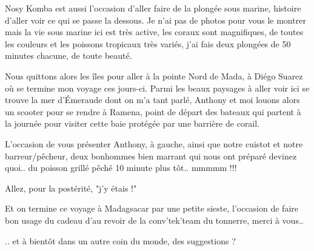 \begin{multicols}{2}
Nosy Komba est aussi l'occasion d'aller faire de la plongée sous marine, histoire d'aller voir ce qui se passe la dessous. Je n'ai pas de photos pour vous le montrer mais la vie sous marine ici est très active, les coraux sont magnifiques, de toutes les couleurs et les poissons tropicaux très variés, j'ai fais deux plongées de 50 minutes chacune, de toute beauté.

Nous quittons alors les îles pour aller à la pointe Nord de Mada, à Diégo Suarez où se termine mon voyage ces jours-ci. Parmi les beaux paysages à aller voir ici se trouve la mer d'Émeraude dont on m'a tant parlé, Anthony et moi louons alors un scooter pour se rendre à Ramena, point de départ des bateaux qui partent à la journée pour visiter cette baie protégée par une barrière de corail.

L'occasion de vous présenter Anthony, à gauche, ainsi que notre cuistot et notre barreur/pêcheur, deux bonhommes bien marrant qui nous ont préparé devinez quoi.. du poisson grillé pêché 10 minute plus tôt.. mmmmm !!!


Allez, pour la postérité, "j'y étais !"


Et on termine ce voyage à Madagsacar par une petite sieste, l'occasion de faire bon usage du cadeau d'au revoir de la conv'tek'team du tonnerre, merci à vous..


.. et à bientôt dans un autre coin du monde, des suggestions ?

\end{multicols}


